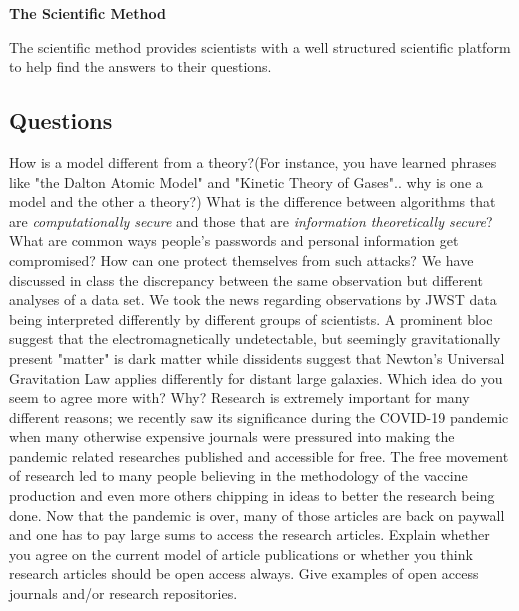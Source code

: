 \documentclass[12pt,addpoints]{exam}
\begin{document}
		\begin{center}
		\textbf{The Scientific Method} 	
		\end{center}
		The scientific method provides scientists with a well structured
		scientific platform to help find the answers to their questions. 
	\begin{center}
	\subsection*{Questions}	
	\end{center}
	\begin{questions}
		\question How is a model different from a theory?(For instance, you have learned phrases like "the Dalton Atomic Model" and "Kinetic Theory of Gases".. why is one a model and the other a theory?)\vspace{2in}
		\question What is the difference between algorithms that are \textit{computationally secure} and those that are \textit{information theoretically secure}?\vspace{2in}
		\question What are common ways people's passwords and personal information get compromised? How can one protect themselves from such attacks?\vspace{2in}
		\question We have discussed in class the discrepancy between the same observation but different analyses of a data set. We took the news regarding observations by JWST data being interpreted differently by different groups of scientists. A prominent bloc suggest that the electromagnetically undetectable, but seemingly gravitationally present "matter" is dark matter while dissidents suggest that Newton's Universal Gravitation Law applies differently for distant large galaxies. Which idea do you seem to agree more with? Why? \vspace{2in}
		\question Research is extremely important for many different reasons; we recently saw its significance during the COVID-19 pandemic when many otherwise expensive journals were pressured into making the pandemic related researches published and accessible for free. The free movement of research led to many people believing in the methodology of the vaccine production and even more others chipping in ideas to better the research being done. Now that the pandemic is over, many of those articles are back on paywall and one has to pay large sums to access the research articles. Explain whether you agree on the current model of article publications or whether you think research articles should be open access always. Give examples of open access journals and/or research repositories. \vspace{3in}

\end{questions}
\end{document}
